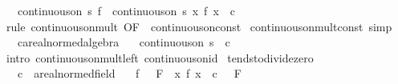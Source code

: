 \begin{isabellebody}
\ \ \ {\isachardoublequoteopen}continuous{\isacharunderscore}{\kern0pt}on\ s\ f\ {\isasymLongrightarrow}\ continuous{\isacharunderscore}{\kern0pt}on\ s\ {\isacharparenleft}{\kern0pt}{\isasymlambda}x{\isachardot}{\kern0pt}\ f\ x\ {\isacharasterisk}{\kern0pt}\ c{\isacharparenright}{\kern0pt}{\isachardoublequoteclose}\isanewline
%
\isadelimproof
%
\endisadelimproof
%
\isatagproof
{}\isamarkupfalse%
\ {\isacharparenleft}{\kern0pt}rule\ continuous{\isacharunderscore}{\kern0pt}on{\isacharunderscore}{\kern0pt}mult\ {\isacharbrackleft}{\kern0pt}OF\ {\isacharunderscore}{\kern0pt}\ continuous{\isacharunderscore}{\kern0pt}on{\isacharunderscore}{\kern0pt}const{\isacharbrackright}{\kern0pt}{\isacharparenright}{\kern0pt}%
\endisatagproof
{\isafoldproof}%
%
\isadelimproof
\isanewline
%
\endisadelimproof
\isanewline
{}\isamarkupfalse%
\ continuous{\isacharunderscore}{\kern0pt}on{\isacharunderscore}{\kern0pt}mult{\isacharunderscore}{\kern0pt}const\ {\isacharbrackleft}{\kern0pt}simp{\isacharbrackright}{\kern0pt}{\isacharcolon}{\kern0pt}\isanewline
\ \ \ c{\isacharcolon}{\kern0pt}{\isacharcolon}{\kern0pt}{\isachardoublequoteopen}{\isacharprime}{\kern0pt}a{\isacharcolon}{\kern0pt}{\isacharcolon}{\kern0pt}real{\isacharunderscore}{\kern0pt}normed{\isacharunderscore}{\kern0pt}algebra{\isachardoublequoteclose}\isanewline
\ \ \ {\isachardoublequoteopen}continuous{\isacharunderscore}{\kern0pt}on\ s\ {\isacharparenleft}{\kern0pt}{\isacharparenleft}{\kern0pt}{\isacharasterisk}{\kern0pt}{\isacharparenright}{\kern0pt}\ c{\isacharparenright}{\kern0pt}{\isachardoublequoteclose}\isanewline
%
\isadelimproof
\ \ %
\endisadelimproof
%
\isatagproof
{}\isamarkupfalse%
\ {\isacharparenleft}{\kern0pt}intro\ continuous{\isacharunderscore}{\kern0pt}on{\isacharunderscore}{\kern0pt}mult{\isacharunderscore}{\kern0pt}left\ continuous{\isacharunderscore}{\kern0pt}on{\isacharunderscore}{\kern0pt}id{\isacharparenright}{\kern0pt}%
\endisatagproof
{\isafoldproof}%
%
\isadelimproof
\isanewline
%
\endisadelimproof
\isanewline
{}\isamarkupfalse%
\ tendsto{\isacharunderscore}{\kern0pt}divide{\isacharunderscore}{\kern0pt}zero{\isacharcolon}{\kern0pt}\isanewline
\ \ \ c\ {\isacharcolon}{\kern0pt}{\isacharcolon}{\kern0pt}\ {\isachardoublequoteopen}{\isacharprime}{\kern0pt}a{\isacharcolon}{\kern0pt}{\isacharcolon}{\kern0pt}real{\isacharunderscore}{\kern0pt}normed{\isacharunderscore}{\kern0pt}field{\isachardoublequoteclose}\isanewline
\ \ \ {\isachardoublequoteopen}{\isacharparenleft}{\kern0pt}f\ {\isasymlonglongrightarrow}\ {}{\isacharparenright}{\kern0pt}\ F\ {\isasymLongrightarrow}\ {\isacharparenleft}{\kern0pt}{\isacharparenleft}{\kern0pt}{\isasymlambda}x{\isachardot}{\kern0pt}\ f\ x\ {\isacharslash}{\kern0pt}\ c{\isacharparenright}{\kern0pt}\ {\isasymlonglongrightarrow}\ {}{\isacharparenright}{\kern0pt}\ F{\isachardoublequoteclose}\isanewline

\end{isabellebody}

